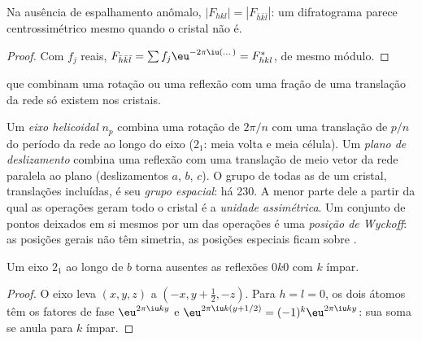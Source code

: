 \begin{proposition}\label{prop:b3:x-ray-diffraction:friedel}
Na ausência de espalhamento anômalo, $|F_{hkl}| = |F_{\bar h\bar k\bar l}|$: um difratograma
parece centrossimétrico mesmo quando o cristal não é.
\end{proposition}

\begin{proof}
Com $f_j$ reais, $F_{\bar h\bar k\bar l} = \sum f_j\eu^{-2\pi\iu(\dots)} = F_{hkl}^*$, de mesmo
módulo.
\end{proof}

 que combinam uma rotação ou uma reflexão com uma fração de
uma translação da rede só existem nos cristais.

\begin{definition}\label{def:b3:x-ray-diffraction:space-group}
Um \emph{eixo helicoidal} $n_p$ combina uma rotação de $2\pi/n$ com
uma translação de $p/n$ do período da rede ao longo do eixo ($2_1$: meia volta e
meia célula). Um \emph{plano de deslizamento} combina uma
reflexão com uma translação de meio vetor da rede paralela ao plano
(deslizamentos $a$, $b$, $c$). O grupo de todas as  de um cristal,
translações incluídas, é seu \emph{grupo espacial}: há 230. A
menor parte dele a partir da qual as operações geram todo o cristal é a
\emph{unidade assimétrica}. Um conjunto de pontos
deixados em si mesmos por um  das operações é uma \emph{posição de
Wyckoff}: as posições gerais não têm simetria, as posições
especiais ficam sobre .
\end{definition}

\begin{proposition}\label{prop:b3:x-ray-diffraction:screw-absence}
Um eixo $2_1$ ao longo de $b$ torna ausentes as reflexões $0k0$ com $k$ ímpar.
\end{proposition}

\begin{proof}
O eixo leva $(x, y, z)$ a $(-x, y + \frac12, -z)$. Para $h = l = 0$, os dois átomos têm
os fatores de fase $\eu^{2\pi\iu ky}$ e $\eu^{2\pi\iu k(y + 1/2)} = (-1)^k\eu^{2\pi\iu ky}$: sua soma
se anula para $k$ ímpar.
\end{proof}

